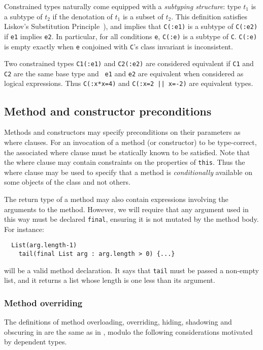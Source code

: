 Constrained types naturally come equipped with a {\em subtyping
structure}: type $t_1$ is a subtype of $t_2$ if the denotation of
$t_1$ is a subset of $t_2$. This definition satisfies
Liskov's Substitution Principle~\cite{liskov-behaviors}),
and implies that
{\tt C(:e1)} is a subtype of {\tt C(:e2)} if {\tt e1} implies {\tt e2}.
In particular, for all conditions {\tt e},
{\tt C(:e)} is a subtype of {\tt C}.
{\tt C(:e)} is empty exactly
when {\tt e} conjoined with {\tt C}'s class invariant is inconsistent.

Two constrained types {\tt C1(:e1)} and {\tt C2(:e2)} are considered
equivalent if {\tt C1} and {\tt C2} are the same base type and {\tt
e1} and {\tt e2} are equivalent when considered as logical
expressions. Thus {\tt C(:x*x=4)} and {\tt C(:x=2 || x=-2)} are
equivalent types.

\subsection{Method and constructor preconditions}

Methods and constructors may specify preconditions on their parameters
as where clauses.  For an invocation of a method (or constructor) to
be type-correct, the associated where clause must be statically known
to be satisfied. Note that the where clause may contain constraints on
the properties of {\tt this}. Thus the where clause may be used to
specify that a method is {\em conditionally} available on some objects
of the class and not others.

The
return type of a method may also contain expressions involving the
arguments to the method. However, we will require
that any argument used in this way must be declared {\tt final},
ensuring it is not mutated by the method body.
For instance:
\begin{verbatim}
  List(arg.length-1)
    tail(final List arg : arg.length > 0) {...}
\end{verbatim}
\noindent will be a valid method declaration. It says that
{\tt tail} must be passed a non-empty list, and it returns a list
whose length is one less than its argument.

\subsubsection{Method overriding}
The definitions of method overloading, overriding, hiding, shadowing
and obscuring in \Xten{} are the same as in \Java, modulo the following
considerations motivated by dependent types.

